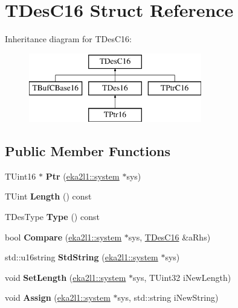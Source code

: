 \hypertarget{struct_t_des_c16}{}\section{T\+Des\+C16 Struct Reference}
\label{struct_t_des_c16}
Inheritance diagram for T\+Des\+C16\+:\begin{figure}[H]
\begin{center}
\leavevmode
\includegraphics[height=3.000000cm]{struct_t_des_c16}
\end{center}
\end{figure}
\subsection*{Public Member Functions}
\begin{DoxyCompactItemize}
\item 
\mbox{\label{struct_t_des_c16_ae799c57473cba749db107fa385395fd5}} 
T\+Uint16 $\ast$ {\bfseries Ptr} (\mbox{\hyperlink{classeka2l1_1_1system}{eka2l1\+::system}} $\ast$sys)
\item 
\mbox{\label{struct_t_des_c16_a35e79c6b0d6febd649037509b7a7ffed}} 
T\+Uint {\bfseries Length} () const
\item 
\mbox{\label{struct_t_des_c16_aec63c04476bf0c014e96744596331077}} 
T\+Des\+Type {\bfseries Type} () const
\item 
\mbox{\label{struct_t_des_c16_abbaac5bddb85bafe153821dbe27d39aa}} 
bool {\bfseries Compare} (\mbox{\hyperlink{classeka2l1_1_1system}{eka2l1\+::system}} $\ast$sys, \mbox{\hyperlink{struct_t_des_c16}{T\+Des\+C16}} \&a\+Rhs)
\item 
\mbox{\label{struct_t_des_c16_a29e43d665eef96043d8ef457537e99c1}} 
std\+::u16string {\bfseries Std\+String} (\mbox{\hyperlink{classeka2l1_1_1system}{eka2l1\+::system}} $\ast$sys)
\item 
\mbox{\label{struct_t_des_c16_ab55b525725db321cb5f9a9f069cd7cfd}} 
void {\bfseries Set\+Length} (\mbox{\hyperlink{classeka2l1_1_1system}{eka2l1\+::system}} $\ast$sys, T\+Uint32 i\+New\+Length)
\item 
\mbox{\label{struct_t_des_c16_abbb22496b6c5edf35f15af9a9d59083d}} 
void {\bfseries Assign} (\mbox{\hyperlink{classeka2l1_1_1system}{eka2l1\+::system}} $\ast$sys, std\+::string i\+New\+String)
\end{DoxyCompactItemize}
